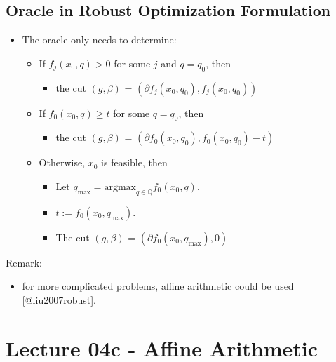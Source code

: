 \documentclass[
]{article}
\providecommand{\tightlist}{%
  \setlength{\itemsep}{0pt}\setlength{\parskip}{0pt}}
\begin{document}
\hypertarget{oracle-in-robust-optimization-formulation}{%
\subsection{Oracle in Robust Optimization Formulation}\label{oracle-in-robust-optimization-formulation}}

\begin{itemize}
\tightlist
\item
  The oracle only needs to determine:

  \begin{itemize}
  \tightlist
  \item
    If \(f_j(x_0, q) > 0\) for some \(j\) and \(q = q_0\),
    then

    \begin{itemize}
    \tightlist
    \item
      the cut \((g, \beta)\) =
      \((\partial f_j(x_0, q_0), f_j(x_0, q_0))\)
    \end{itemize}
  \item
    If \(f_0(x_0, q) \geq t\) for some
    \(q = q_0\), then

    \begin{itemize}
    \tightlist
    \item
      the cut \((g, \beta)\) =
      \((\partial f_0(x_0, q_0), f_0(x_0, q_0) - t)\)
    \end{itemize}
  \item
    Otherwise, \(x_0\) is feasible, then

    \begin{itemize}
    \tightlist
    \item
      Let
      \(q_{\max} = \text{argmax}_{q \in \mathbb Q} f_0(x_0, q)\).
    \item
      \(t := f_0(x_0, q_{\max})\).
    \item
      The cut \((g, \beta)\) =
      \((\partial f_0(x_0, q_{\max}), 0)\)
    \end{itemize}
  \end{itemize}
\end{itemize}

Remark:

\begin{itemize}
\tightlist
\item
  for more complicated problems, affine arithmetic could be used {[}@liu2007robust{]}.
\end{itemize}

\hypertarget{lecture-04c---affine-arithmetic}{%
\section{Lecture 04c - Affine Arithmetic}\label{lecture-04c---affine-arithmetic}}
\end{document}
